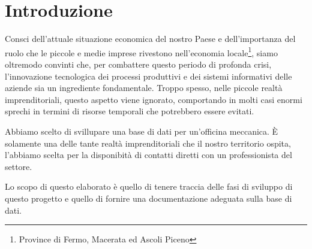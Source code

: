 \section{Introduzione}

	Consci dell'attuale situazione economica del nostro Paese e dell'importanza del ruolo che le piccole e medie imprese rivestono nell'economia locale\footnote{Province di Fermo, Macerata ed Ascoli Piceno}, siamo oltremodo convinti che, per combattere questo periodo di profonda crisi, l'innovazione tecnologica dei processi produttivi e dei sistemi informativi delle aziende sia un ingrediente fondamentale. Troppo spesso, nelle piccole realtà imprenditoriali, questo aspetto viene ignorato, comportando in molti casi enormi sprechi in termini di risorse temporali che potrebbero essere evitati.
	
	Abbiamo scelto di svillupare una base di dati per un'officina meccanica. È solamente una delle tante realtà imprenditoriali che il nostro territorio ospita, l'abbiamo scelta per la disponibità di contatti diretti con un professionista del settore.
	
	Lo scopo di questo elaborato è quello di tenere traccia delle fasi di sviluppo di questo progetto e quello di fornire una documentazione adeguata sulla base di dati.